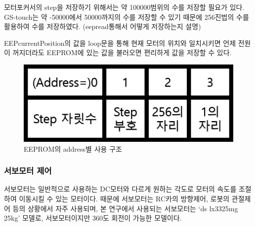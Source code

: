 \documentclass[twoside,11pt]{gshs_thesis}
\begin{document}
  모터포커서의 step을 저장하기 위해서는 약 100000범위의 수를 저장할 필요가 있다. GS-touch는 약 -50000에서 50000까지의 수를 저장할 수 있기 때문에 256진법의 수를 활용하여 수를 저장하였다.
(eepread통해서 어떻게 저장하는지 설명)

 EEPcurrentPosition의 값을 loop문을 통해 현재 모터의 위치와 일치시키면 언제 전원이 꺼지더라도 EEPROM에 있는 값을 불러오면 편리하게 값을 저장할 수 있다.

\begin{figure}[h]
	\begin{center}
		\includegraphics[width = 5 cm]{eeprom1}
	\end{center}
	\caption{EEPROM의 address별 사용 구조}
	\label{eeprom1}
\end{figure}

\subsubsection{서보모터 제어}

 서보모터는 일반적으로 사용하는 DC모터와 다르게 원하는 각도로 모터의 속도를 조절하여 이동시킬 수 있는 모터이다. 때문에 서보모터는 RC카의 방향제어, 로봇의 관절제어 등의 상황에서 자주 사용되며, 본 연구에서 사용되는 서보모터는 ‘ds lx3325mg 25kg’ 모델로, 서보모터이지만 360도 회전이 가능한 모델이다.
 
\end{document}
